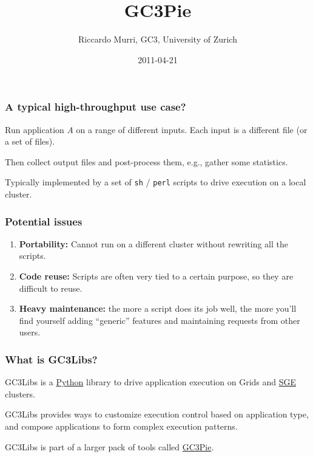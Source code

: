 \documentclass[presentation]{beamer}
\begin{document}
\title{GC3Pie}
\author{Riccardo Murri, GC3, University of Zurich}
\date{2011-04-21}
\maketitle





\begin{frame}
\frametitle{A typical high-throughput use case?}
\label{sec-1}


  Run application \emph{A} on a range of different inputs.
  Each input is a different file (or a set of files).

  Then collect output files and post-process them, e.g., gather some
  statistics.

  Typically implemented by a set of \texttt{sh} / \texttt{perl} scripts to drive
  execution on a local cluster.
\end{frame}
\begin{frame}
\frametitle{Potential issues}
\label{sec-2}


\begin{enumerate}
\item \textbf{Portability:} Cannot run on a different cluster without rewriting
   all the scripts.
\item \textbf{Code reuse:} Scripts are often very tied to a certain purpose, so
   they are difficult to reuse.
\item \textbf{Heavy maintenance:} the more a script does its job well, the more
   you'll find yourself adding ``generic'' features and maintaining
   requests from other users.
\end{enumerate}
\end{frame}
\begin{frame}
\frametitle{What is GC3Libs?}
\label{sec-3}


  GC3Libs is a \href{http://www.python.org/}{Python} library to drive application execution on Grids
  and \href{http://www.oracle.com/us/products/tools/oracle-grid-engine-075549.html}{SGE} clusters.

  GC3Libs provides ways to customize execution control based on
  application type, and compose applications to form complex execution
  patterns.

  GC3Libs is part of a larger pack of tools called \href{http://gc3pie.googlecode.com/}{GC3Pie}.
  
\end{frame}
\end{document}
